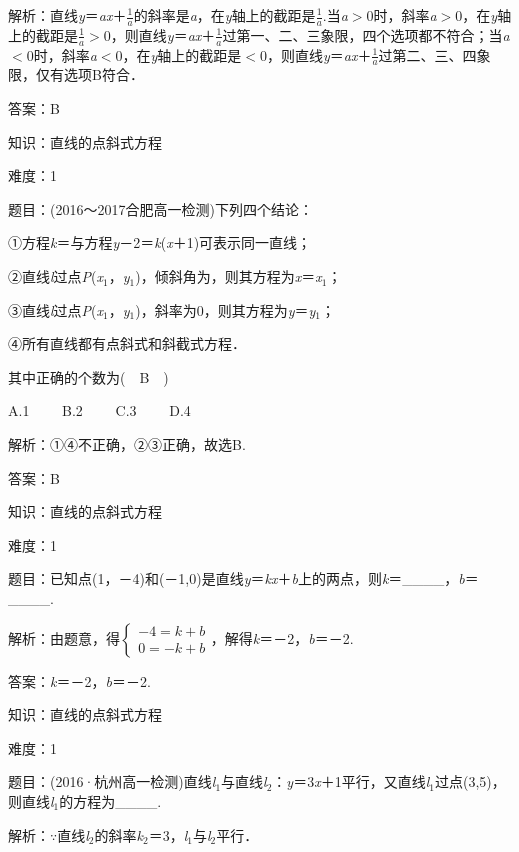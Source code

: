 \documentclass{article} %
\begin{document}
解析：直线\textit{y}＝\textit{ax}＋$\frac{1}{a}$的斜率是\textit{a}，在\textit{y}轴上的截距是$\frac{1}{a}$.当\textit{a}$\mathrm{>}$0时，斜率\textit{a}$\mathrm{>}$0，在\textit{y}轴上的截距是$\frac{1}{a}\mathrm{>}$0，则直线\textit{y}＝\textit{ax}＋$\frac{1}{a}$过第一、二、三象限，四个选项都不符合；当\textit{a}$\mathrm{<}$0时，斜率\textit{a}$\mathrm{<}$0，在\textit{y}轴上的截距是$\mathrm{<}$0，则直线\textit{y}＝\textit{ax}＋$\frac{1}{a}$过第二、三、四象限，仅有选项B符合．

答案：B

知识：直线的点斜式方程

难度：1

题目：(2016～2017合肥高一检测)下列四个结论：

①方程\textit{k}＝与方程\textit{y}－2＝\textit{k}(\textit{x}＋1)可表示同一直线；

②直线\textit{l}过点\textit{P}(\textit{x}${}_{1}$，\textit{y}${}_{1}$)，倾斜角为，则其方程为\textit{x}＝\textit{x}${}_{1}$；

③直线\textit{l}过点\textit{P}(\textit{x}${}_{1}$，\textit{y}${}_{1}$)，斜率为0，则其方程为\textit{y}＝\textit{y}${}_{1}$；

④所有直线都有点斜式和斜截式方程．

其中正确的个数为(　B　)

A.1　　 B.2　　 C.3　　 D.4

解析：①④不正确，②③正确，故选B.

答案：B 

知识：直线的点斜式方程

难度：1

题目：已知点(1，－4)和(－1,0)是直线\textit{y}＝\textit{kx}＋\textit{b}上的两点，则\textit{k}＝\_\_\_\_，\textit{b}＝\_\_\_\_.

解析：由题意，得$\left\{\begin{array}{l} -4=k+b\\ 0=-k+b \end{array}\right.$，解得\textit{k}＝－2，\textit{b}＝－2.

答案：\textit{k}＝－2，\textit{b}＝－2.

知识：直线的点斜式方程

难度：1

题目：(2016·杭州高一检测)直线\textit{l}${}_{1}$与直线\textit{l}${}_{2}$：\textit{y}＝3\textit{x}＋1平行，又直线\textit{l}${}_{1}$过点(3,5)，则直线\textit{l}${}_{1}$的方程为\_\_\_\_.

解析：$\mathrm{\because}$直线\textit{l}${}_{2}$的斜率\textit{k}${}_{2}$＝3，\textit{l}${}_{1}$与\textit{l}${}_{2}$平行．
\end{document}
